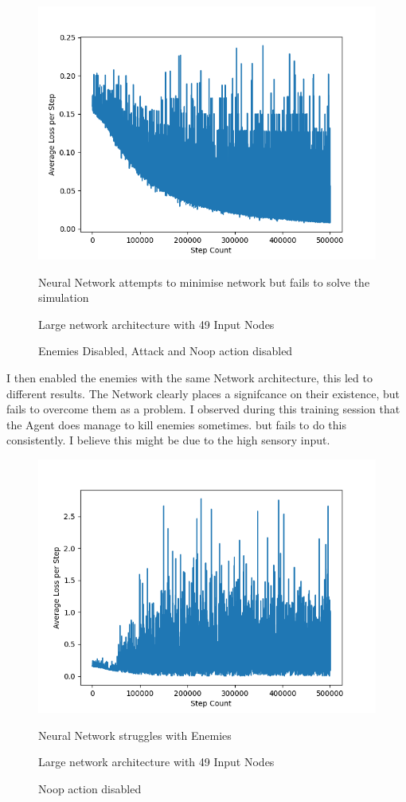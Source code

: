\begin{flushleft}
        \begin{figure}[H]
            \centering
            \includegraphics[width=12cm]{Images/Evaluation/AttemptedMinimiseLargeNetwork.png}
            \caption*{Neural Network attempts to minimise network but fails to solve the simulation}
            \caption*{Large network architecture with 49 Input Nodes} 
            \caption*{Enemies Disabled, Attack and Noop action disabled}
        \end{figure}

        I then enabled the enemies with the same Network architecture, this led to different results. The Network clearly places a signifcance on their
        existence, but fails to overcome them as a problem. I observed during this training session that the Agent does manage to kill enemies sometimes.
        but fails to do this consistently. I believe this might be due to the high sensory input.

        \begin{figure}[H]
            \centering
            \includegraphics[width=12cm]{Images/Evaluation/EnemiesEnabled.png}
            \caption*{Neural Network struggles with Enemies}
            \caption*{Large network architecture with 49 Input Nodes} 
            \caption*{Noop action disabled}
        \end{figure}


\end{flushleft}

